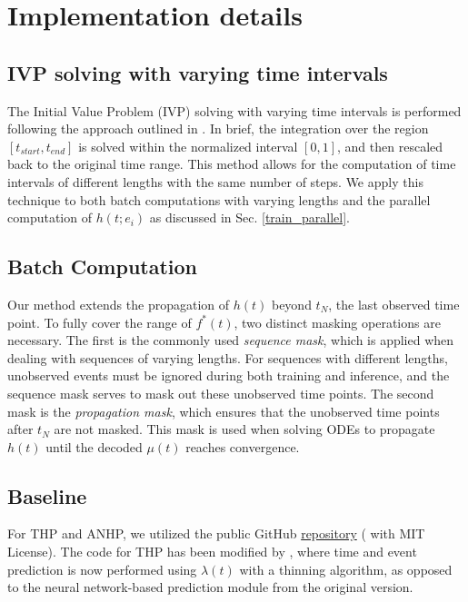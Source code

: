 \section{Implementation details}

\subsection{IVP solving with varying time intervals \label{appen: varied time}} 
The Initial Value Problem (IVP) solving with varying time intervals is performed following the approach outlined in \cite{bib:STPP}. 
In brief, the integration over the region $[t_{start}, t_{end}]$ is solved within the normalized interval $[0, 1]$, and then rescaled back to the original time range. 
This method allows for the computation of time intervals of different lengths with the same number of steps. 
We apply this technique to both batch computations with varying lengths and the parallel computation of $h(t;e_i)$ as discussed in Sec. \ref{train_parallel}.

\subsection{Batch Computation}
Our method extends the propagation of $h(t)$ beyond $t_N$, the last observed time point. 
To fully cover the range of $f^*(t)$, two distinct masking operations are necessary. 
The first is the commonly used \textit{sequence mask}, which is applied when dealing with sequences of varying lengths. 
For sequences with different lengths, unobserved events must be ignored during both training and inference, and the sequence mask serves to mask out these unobserved time points. 
The second mask is the \textit{propagation mask}, which ensures that the unobserved time points after $t_N$ are not masked. 
This mask is used when solving ODEs to propagate $h(t)$ until the decoded $\mu(t)$ reaches convergence.


\subsection{Baseline \label{sec:baselineImplementation}}

For THP and ANHP, we utilized the public GitHub \href{https://github.com/yangalan123/anhp-andtt}{repository} (\cite{bib:ANHP} with MIT License). 
The code for THP has been modified by \cite{bib:ANHP}, where time and event prediction is now performed using $\lambda(t)$ with a thinning algorithm, as opposed to the neural network-based prediction module from the original version.

